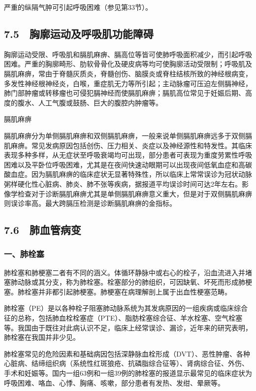 严重的纵隔气肿可引起呼吸困难（参见第33节）。

\protect\hypertarget{text00049.html}{}{}

\subsection{7.5　胸廓运动及呼吸肌功能障碍}

胸廓运动受限、呼吸肌和膈肌麻痹、膈高位等皆可使肺呼吸面积减少，而引起呼吸困难。严重的胸廓畸形、肋软骨骨化及硬皮病等均可使胸廓活动受限制；呼吸肌及膈肌麻痹，常由于脊髓灰质炎，脊髓创伤、脑膜炎或脊柱结核所致的神经根病变，多发性神经根神经炎，白喉，重症肌无力等所引起；主动脉瘤可压迫左侧膈神经，肺门部肿瘤或转移瘤也可侵犯膈神经而使膈肌麻痹；膈肌高位常见于妊娠后期、高度的腹水、人工气腹或鼓肠、巨大的腹腔内肿瘤等。

膈肌麻痹

膈肌麻痹分为单侧膈肌麻痹和双侧膈肌麻痹，一般来说单侧膈肌麻痹远多于双侧膈肌麻痹。常见发病原因包括创伤、压力相关、炎症以及神经源性和特发性。其临床表现多种多样，从无症状至呼吸衰竭均可出现，部分患者可表现为重度劳累性呼吸困难以及平卧位呼吸困难，尤其是在夜间快速动眼期可以出现夜间低氧血症和高碳酸血症。因为膈肌麻痹的临床症状无显著特殊性，所以临床上常常误诊为冠状动脉粥样硬化性心脏病、肺炎、肺不张等疾病，据报道平均误诊时间可达2年左右。影像学检查对于诊断膈肌麻痹尤其是单侧膈肌麻痹意义重大，但是对于双侧膈肌麻痹则误诊率高。最大跨膈压检测是诊断膈肌麻痹的金指标。

\protect\hypertarget{text00050.html}{}{}

\subsection{7.6　肺血管病变}

\subsubsection{一、肺栓塞}

肺栓塞和肺梗塞二者有不同的涵义。体循环静脉中或右心的栓子，沿血流进入并堵塞肺动脉或其分支，称为肺栓塞。栓塞部分的肺组织，可因缺氧、坏死而形成肺梗塞。肺栓塞并非都引起肺梗塞。肺梗塞在病理解剖上属于出血性梗塞范畴。

肺栓塞（PE）是以各种栓子阻塞肺动脉系统为其发病原因的一组疾病或临床综合征的总称，包括肺血栓栓塞症（PTE）、脂肪栓塞综合征、羊水栓塞、空气栓塞等。我国由于既往对此病认识不足，临床上经常误诊、漏诊，近年来的研究表明，肺栓塞在我国并非少见。

肺栓塞常见的危险因素和基础病因包括深静脉血栓形成（DVT）、恶性肿瘤、各种心脏病、结缔组织病（系统性红斑狼疮、抗磷脂综合征等）、肾病综合征、外伤、手术和妊娠等。国内一组63例和一组39例的肺栓塞的报道显示最常见的临床症状为呼吸困难、咯血、心悸、胸痛、咳嗽，部分患者有发热、发绀、晕厥等。

